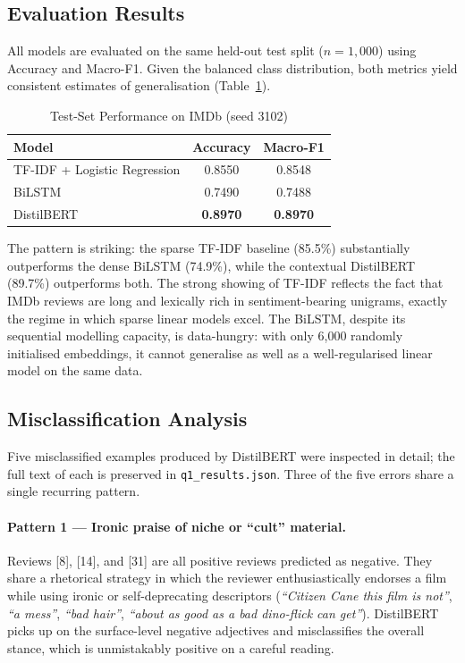 \subsection{Evaluation Results}

All models are evaluated on the same held-out test split ($n=1{,}000$) using
Accuracy and Macro-F1. Given the balanced class distribution, both metrics
yield consistent estimates of generalisation
(Table~\ref{tab:q1_results}).

\begin{table}[h]
\centering
\caption{Test-Set Performance on IMDb (seed 3102)}
\label{tab:q1_results}
\begin{tabular}{lcc}
\toprule
Model & Accuracy & Macro-F1 \\
\midrule
TF-IDF + Logistic Regression & 0.8550 & 0.8548 \\
BiLSTM                       & 0.7490 & 0.7488 \\
DistilBERT                   & \textbf{0.8970} & \textbf{0.8970} \\
\bottomrule
\end{tabular}
\end{table}

The pattern is striking: the sparse TF-IDF baseline (85.5\%) substantially
outperforms the dense BiLSTM (74.9\%), while the contextual DistilBERT
(89.7\%) outperforms both. The strong showing of TF-IDF reflects the
fact that IMDb reviews are long and lexically rich in sentiment-bearing
unigrams, exactly the regime in which sparse linear models excel. The
BiLSTM, despite its sequential modelling capacity, is data-hungry: with
only 6{,}000 randomly initialised embeddings, it cannot generalise as
well as a well-regularised linear model on the same data.

\subsection{Misclassification Analysis}

Five misclassified examples produced by DistilBERT were inspected in
detail; the full text of each is preserved in
\texttt{q1\_results.json}. Three of the five errors share a single
recurring pattern.

\paragraph{Pattern 1 — Ironic praise of niche or ``cult'' material.}
Reviews [8], [14], and [31] are all positive reviews predicted as
negative. They share a rhetorical strategy in which the reviewer
enthusiastically endorses a film while using ironic or self-deprecating
descriptors (\textit{``Citizen Cane this film is not''}, \textit{``a
mess''}, \textit{``bad hair''}, \textit{``about as good as a bad
dino-flick can get''}). DistilBERT picks up on the surface-level negative
adjectives and misclassifies the overall stance, which is unmistakably
positive on a careful reading.

